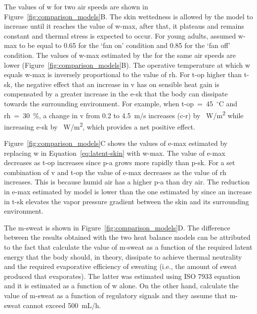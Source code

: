 The values of \ac{w} for two air speeds are shown in Figure~\ref{fig:comparison_models}B\@.
The skin wettedness is allowed by the model to increase until it reaches the value of \ac{w-max}, after that, it plateaus and remains constant and thermal stress is expected to occur.
For young adults,  assumed \ac{w-max} to be equal to 0.65 for the `fan on' condition and 0.85 for the `fan off' condition.
The values of \ac{w-max} estimated by the  for the same air speeds are lower (Figure~\ref{fig:comparison_models}B).
The operative temperature at which \ac{w} equals \ac{w-max} is inversely proportional to the value of \ac{rh}.
For \ac{t-op} higher than \ac{t-sk}, the negative effect that an increase in \ac{v} has on sensible heat gain is compensated by a greater increase in the \acf{e-sk} that the body can dissipate towards the surrounding environment.
For example, when \ac{t-op}~=~45~$^{\circ}$C and \ac{rh}~=~30~\%, a change in \ac{v} from 0.2 to 4.5~m/s increases (\acs{c-r}) by ~W/m\textsuperscript{2} while increasing \ac{e-sk} by ~W/m\textsuperscript{2}, which provides a net positive effect.

Figure~\ref{fig:comparison_models}C shows the values of \ac{e-max} estimated by replacing \ac{w} in Equation~\ref{eq:latent-skin} with \ac{w-max}.
The value of \ac{e-max} decreases as \ac{t-op} increases since \ac{p-a} grows more rapidly than \ac{p-sk}.
For a set combination of \ac{v} and \ac{t-op} the value of \ac{e-max} decreases as the value of \ac{rh} increases.
This is because humid air has a higher \ac{p-a} than dry air.
The reduction in \ac{e-max} estimated by  model is lower than the one estimated by  since an increase in \ac{t-sk} elevates the vapor pressure gradient between the skin and its surrounding environment.

The \acf{m-sweat} is shown in Figure~\ref{fig:comparison_models}D\@.
The difference between the results obtained with the two heat balance models can be attributed to the fact that \citeauthor{Jay2015} calculate the value of \ac{m-sweat} as a function of the required latent energy that the body should, in theory, dissipate to achieve thermal neutrality and the required evaporative efficiency of sweating (i.e., the amount of sweat produced that evaporates).
The latter was estimated using ISO 7933 equation and it is estimated as a function of \ac{w} alone.
On the other hand, \citeauthor{GaggeSET} calculate the value of \ac{m-sweat} as a function of regulatory signals and they assume that \ac{m-sweat} cannot exceed 500~mL/h.

